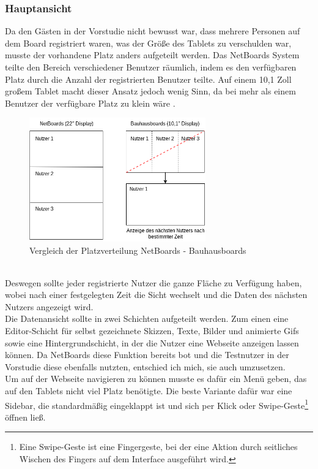 \subsubsection{Hauptansicht}\label{Hauptansicht}
Da den Gästen in der Vorstudie nicht bewusst war, dass mehrere Personen auf dem Board registriert waren, was der Größe des Tablets zu verschulden war, musste der vorhandene Platz anders aufgeteilt werden. Das NetBoards System teilte den Bereich verschiedener Benutzer räumlich, indem es den verfügbaren Platz durch die Anzahl der registrierten Benutzer teilte.
Auf einem 10,1 Zoll großem Tablet macht dieser Ansatz jedoch wenig Sinn, da bei mehr als einem Benutzer der verfügbare Platz zu klein wäre .
\begin{figure}[h!]
  \centering
    \includegraphics[width=0.68\textwidth]{./img/AufteilungMainView.png}
  \caption{Vergleich der Platzverteilung NetBoards - Bauhausboards}
  \label{img:aufteilungMainView}
\end{figure}
\\
Deswegen sollte jeder registrierte Nutzer die ganze Fläche zu Verfügung haben, wobei nach einer festgelegten Zeit die Sicht wechselt und die Daten des nächsten Nutzers angezeigt wird.
\\
Die Datenansicht sollte in zwei Schichten aufgeteilt werden. Zum einen eine Editor-Schicht für selbst gezeichnete Skizzen, Texte, Bilder und animierte Gifs sowie eine Hintergrundschicht, in der die Nutzer eine Webseite anzeigen lassen können. Da NetBoards diese Funktion bereits bot und die Testnutzer in der Vorstudie diese ebenfalls nutzten, entschied ich mich, sie auch umzusetzen.
\\
Um auf der Webseite navigieren zu können musste es dafür ein Menü geben, das auf den Tablets nicht viel Platz benötigte. Die beste Variante dafür war eine Sidebar, die standardmäßig eingeklappt ist und sich per Klick oder Swipe-Geste\footnote{Eine Swipe-Geste ist eine Fingergeste, bei der eine Aktion durch seitliches Wischen des Fingers auf dem Interface ausgeführt wird.} öffnen ließ.
